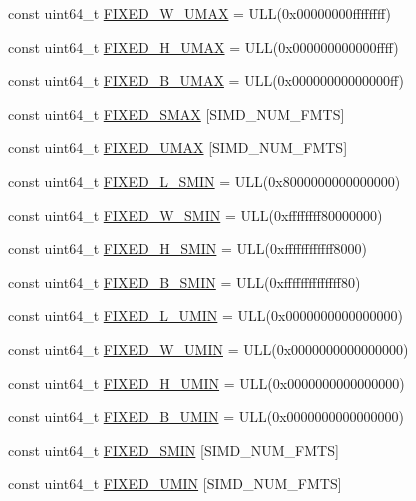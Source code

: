 \begin{DoxyCompactItemize}
\item 
const uint64\_\-t \hyperlink{namespaceMipsISA_a9fdc649ad8c150d9cb5969a6cef7b9af}{FIXED\_\-W\_\-UMAX} = ULL(0x00000000ffffffff)
\item 
const uint64\_\-t \hyperlink{namespaceMipsISA_a9fe6e8880110446df9f2b48464395dc8}{FIXED\_\-H\_\-UMAX} = ULL(0x000000000000ffff)
\item 
const uint64\_\-t \hyperlink{namespaceMipsISA_ab35e34bc34906681016d591f07fa8388}{FIXED\_\-B\_\-UMAX} = ULL(0x00000000000000ff)
\item 
const uint64\_\-t \hyperlink{namespaceMipsISA_ab0e1ac60266a62ef6254becec7c6735f}{FIXED\_\-SMAX} \mbox{[}SIMD\_\-NUM\_\-FMTS\mbox{]}
\item 
const uint64\_\-t \hyperlink{namespaceMipsISA_af1e0a1b1164ae2aed24ee07342194d8c}{FIXED\_\-UMAX} \mbox{[}SIMD\_\-NUM\_\-FMTS\mbox{]}
\item 
const uint64\_\-t \hyperlink{namespaceMipsISA_ad3ea7f4d56d3f8388849a08240cca8ba}{FIXED\_\-L\_\-SMIN} = ULL(0x8000000000000000)
\item 
const uint64\_\-t \hyperlink{namespaceMipsISA_a233a552996272d5c1b73f53d1ffd17de}{FIXED\_\-W\_\-SMIN} = ULL(0xffffffff80000000)
\item 
const uint64\_\-t \hyperlink{namespaceMipsISA_ae673d35643dfe81498cbf17a7e9cd587}{FIXED\_\-H\_\-SMIN} = ULL(0xffffffffffff8000)
\item 
const uint64\_\-t \hyperlink{namespaceMipsISA_a4e61092133665f4dee5dc4f839b9b3c0}{FIXED\_\-B\_\-SMIN} = ULL(0xffffffffffffff80)
\item 
const uint64\_\-t \hyperlink{namespaceMipsISA_a3f3ee51cb5f4d1e09a5b0657804afaec}{FIXED\_\-L\_\-UMIN} = ULL(0x0000000000000000)
\item 
const uint64\_\-t \hyperlink{namespaceMipsISA_adabc2493e3927f0cbddbd225dbb192a3}{FIXED\_\-W\_\-UMIN} = ULL(0x0000000000000000)
\item 
const uint64\_\-t \hyperlink{namespaceMipsISA_a122eaef6c15e79b76c40d39b5090c7b1}{FIXED\_\-H\_\-UMIN} = ULL(0x0000000000000000)
\item 
const uint64\_\-t \hyperlink{namespaceMipsISA_a7982d3f6b301b728e3ce73462cc8bb9a}{FIXED\_\-B\_\-UMIN} = ULL(0x0000000000000000)
\item 
const uint64\_\-t \hyperlink{namespaceMipsISA_aaf5085bdcb1ce2a10d64f7b17b6f46fe}{FIXED\_\-SMIN} \mbox{[}SIMD\_\-NUM\_\-FMTS\mbox{]}
\item 
const uint64\_\-t \hyperlink{namespaceMipsISA_aeab1d8da14eb0f232765217502c593da}{FIXED\_\-UMIN} \mbox{[}SIMD\_\-NUM\_\-FMTS\mbox{]}
\end{DoxyCompactItemize}
